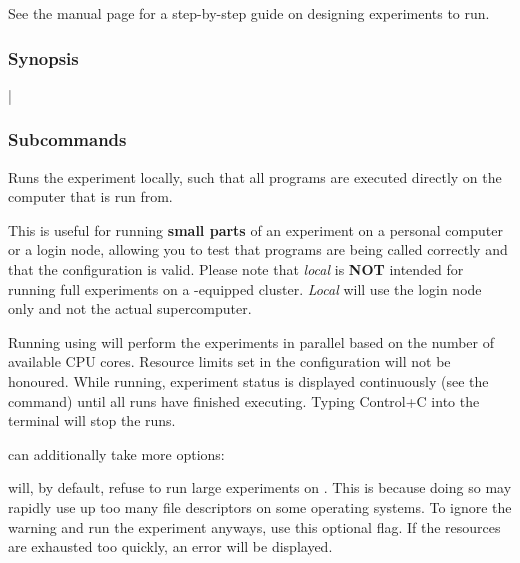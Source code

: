 \documentclass[a4paper,english]{article}
\begin{document}
\begin{adjustwidth}{18pt}{0pt}
                See the manual page  for a step-by-step guide on
                designing experiments to run.


            \subsubsection{Synopsis}
                |

            \subsubsection{Subcommands}
                \begin{Description}[Subcommands]
                    \item[\Arg{local}]
                        Runs the experiment locally, such that all programs are executed directly on the computer
                        that  is run from.

                        This is useful for running \textbf{small parts} of an experiment on
                        a personal computer or a login node, allowing you to test that programs
                        are being called correctly and that the configuration is valid.
                        Please note that \emph{local} is \textbf{NOT} intended for running full
                        experiments on a -equipped cluster.
                        \emph{Local} will use the login node only and not the actual
                        supercomputer.

                        Running using   will perform the experiments in
                        parallel based on the number of available CPU cores.
                        Resource limits set in the configuration will not be honoured.
                        While running, experiment status is displayed continuously (see the
                          command) until all runs have finished executing.
                        Typing Control+C into the terminal will stop the runs.

                         can additionally take more options:
                            \begin{Description}[Options]
                                \item[\Opt{\ddash force}]
                                   will, by default, refuse to run large experiments on . This is
                                  because doing so may rapidly use up too many file descriptors on some operating systems.
                                  To ignore the warning and run the experiment anyways, use this optional flag.
                                  If the resources are exhausted too quickly, an error will be displayed.


\end{Description}
\end{Description}
\end{adjustwidth}
\end{document}
